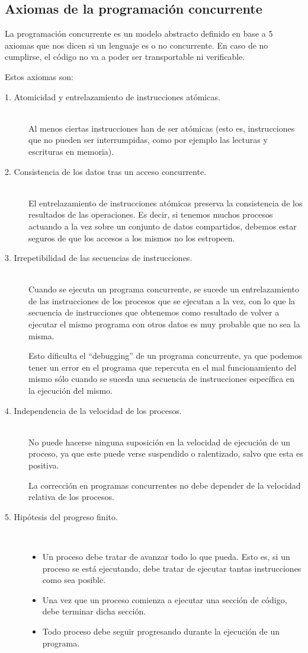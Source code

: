 \subsection{Axiomas de la programación concurrente}
La programación concurrente es un modelo abstracto definido en base a 5 axiomas que nos dicen si un lenguaje es o no concurrente. En caso de no cumplirse, el código no va a poder ser transportable ni verificable.

Estos axiomas son:
\begin{description}
    \item [1. Atomicidad y entrelazamiento de instrucciones atómicas.]~\\
        Al menos ciertas instrucciones han de ser atómicas (esto es, instrucciones que no pueden ser interrumpidas, como por ejemplo las lecturas y escrituras en memoria).
    \item [2. Consistencia de los datos tras un acceso concurrente.]~\\
        El entrelazamiento de instrucciones atómicas preserva la
        consistencia de los resultados de las operaciones. 
        Es decir, si tenemos muchos procesos actuando a la vez sobre un conjunto de datos compartidos, debemos estar seguros de que los accesos a los mismos no los estropeen.
    \item [3. Irrepetibilidad de las secuencias de instrucciones.]~\\
        Cuando se ejecuta un programa concurrente, se sucede un entrelazamiento de las instrucciones de los procesos que se ejecutan a la vez, con lo que la secuencia de instrucciones que obtenemos como resultado de volver a ejecutar el mismo programa con otros datos es muy probable que no sea la misma.

        Esto dificulta el ``debugging'' de un programa concurrente, ya que podemos tener un error en el programa que repercuta en el mal funcionamiento del mismo sólo cuando se suceda una secuencia de instrucciones específica en la ejecución del mismo.
    \item [4. Independencia de la velocidad de los procesos.]~\\
        No puede hacerse ninguna suposición en la velocidad de ejecución de un proceso, ya que este puede verse suspendido o ralentizado, salvo que esta es positiva.

        La corrección en programas concurrentes no debe depender de la velocidad relativa de los procesos.
    \item [5. Hipótesis del progreso finito.]~\\
        \begin{itemize}
            \item Un proceso debe tratar de avanzar todo lo que pueda. Esto es, si un proceso se está ejecutando, debe tratar de ejecutar tantas instrucciones como sea posible.
            \item Una vez que un proceso comienza a ejecutar una sección de código, debe terminar dicha sección.
            \item Todo proceso debe seguir progresando durante la ejecución de un programa.
        \end{itemize}
\end{description}

